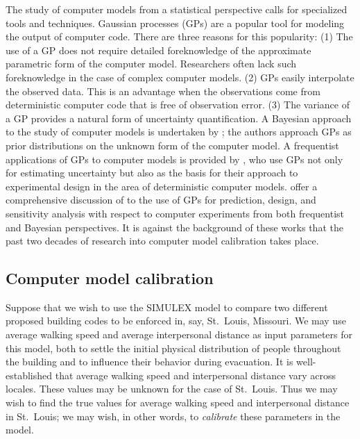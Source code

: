 \documentclass{article}
\begin{document}
The study of computer models from a statistical perspective calls for specialized tools and techniques. Gaussian processes (GPs) are a popular tool for modeling the output of computer code. There are three reasons for this popularity: (1) The use of a GP does not require detailed foreknowledge of the approximate parametric form of the computer model. Researchers often lack such foreknowledge in the case of complex computer models. (2) GPs easily interpolate the observed data. This is an advantage when the observations come from deterministic computer code that is free of observation error. (3) The variance of a GP provides a natural form of uncertainty quantification. 
A Bayesian approach to the study of computer models is undertaken by \cite{Currin1991}; the authors approach GPs as prior distributions on the unknown form of the computer model. A frequentist applications of GPs to computer models is provided by \cite{Sacks1989}, who use GPs not only for estimating uncertainty but also as the basis for their approach to experimental design in the area of deterministic computer models.  \cite{Santner2003a} offer a comprehensive discussion of to the use of GPs for prediction, design, and sensitivity analysis with respect to computer experiments from both frequentist and Bayesian perspectives. It is against the background of these works that the past two decades of research into computer model calibration takes place.

\subsection{Computer model calibration} \label{computer_model_calibration}

Suppose that we wish to use the SIMULEX model to compare two different proposed building codes to be enforced in, say, St.\ Louis, Missouri. We may use average walking speed and average interpersonal distance as input parameters for this model, both to settle the initial physical distribution of people throughout the building and to influence their behavior during evacuation. It is well-established that average walking speed \citep{Bornstein1976} and interpersonal distance \citep{Sorokowska2017} vary across locales. These values may be unknown for the case of St.\ Louis. Thus we may wish to find the true values for average walking speed and interpersonal distance in St.\ Louis; we may wish, in other words, to \textit{calibrate} these parameters in the model.
\end{document}
